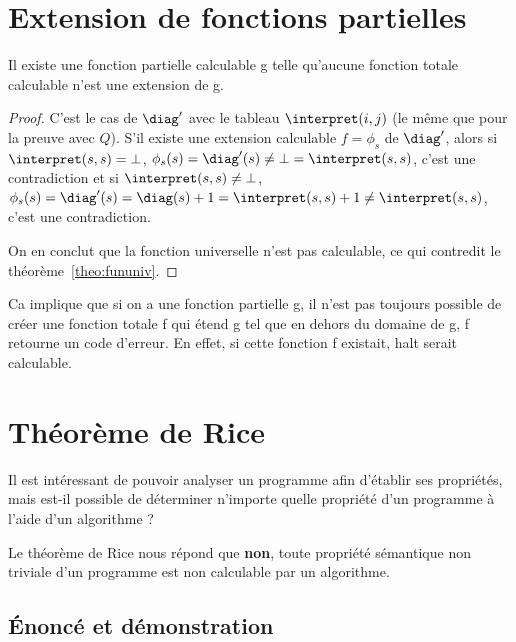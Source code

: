
\section{Extension de fonctions partielles}
\label{sub:extension_de_fonctions_partielles}

\begin{mytheo}
	Il existe une fonction partielle calculable g telle qu'aucune fonction totale calculable n'est une extension de g.
  \begin{proof}
    C'est le cas de $\diag'$ avec le tableau $\interpret(i,j)$ (le même que pour la preuve avec $Q$). S'il existe une extension calculable $f = \phi_s$ de $\diag'$,
    alors si $\interpret(s,s) = \bot$, $\phi_s(s) = \diag'(s) \neq \bot = \interpret(s,s)$, c'est une contradiction
    et si $\interpret(s,s) \neq \bot$, $\phi_s(s) = \diag'(s) = \diag(s)+1 = \interpret(s,s)+1 \neq \interpret(s,s)$,
    c'est une contradiction.

    On en conclut que la fonction universelle n'est pas calculable, ce qui contredit le théorème~\ref{theo:fununiv}.
  \end{proof}
\end{mytheo}

\begin{myrem}
	Ca implique que si on a une fonction partielle g, il n'est pas
	toujours possible de créer une fonction totale f qui étend g
	tel que en dehors du domaine de g, f retourne un code d'erreur.  En effet, si cette fonction f existait, halt serait calculable.
\end{myrem}


\section{Théorème de Rice}
\label{sub:theoreme_de_rice}

Il est intéressant de pouvoir analyser un programme afin d'établir ses propriétés, mais est-il possible de déterminer n'importe quelle propriété d'un programme à l'aide d'un algorithme ?

Le théorème de Rice nous répond que \textbf{non}, toute propriété sémantique non triviale d'un programme est non calculable par un algorithme.

\subsection{Énoncé et démonstration}

